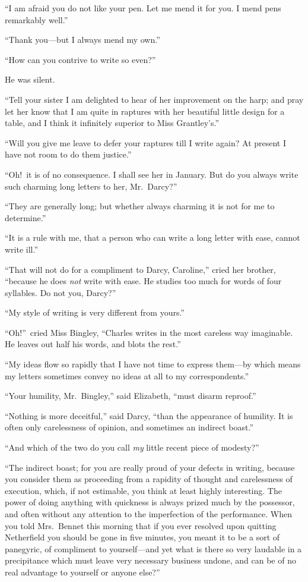 \documentclass[12pt,english]{book}
\begin{document}
{}``I am afraid you do not like your pen. Let me mend it for you.
I mend pens remarkably well.''

{}``Thank you\mbox{---}but I always mend my own.''

{}``How can you contrive to write so even?''\ 

He was silent.

{}``Tell your sister I am delighted to hear of her improvement on
the harp; and pray let her know that I am quite in raptures with her
beautiful little design for a table, and I think it infinitely superior
to Miss Grantley's.''

{}``Will you give me leave to defer your raptures till I write again?
At present I have not room to do them justice.''

{}``Oh!\ it is of no consequence. I shall see her in January. But
do you always write such charming long letters to her, Mr.\ Darcy?''\ 

{}``They are generally long; but whether always charming it is not
for me to determine.''

{}``It is a rule with me, that a person who can write a long letter
with ease, cannot write ill.''

{}``That will not do for a compliment to Darcy, Caroline,'' cried
her brother, {}``because he does \textit{not} write with ease. He
studies too much for words of four syllables. Do not you, Darcy?''\ 

{}``My style of writing is very different from yours.''

{}``Oh!''\ cried Miss Bingley, {}``Charles writes in the most
careless way imaginable. He leaves out half his words, and blots the
rest.''

{}``My ideas flow so rapidly that I have not time to express them\mbox{---}by
which means my letters sometimes convey no ideas at all to my correspondents.''

{}``Your humility, Mr.\ Bingley,'' said Elizabeth, {}``must disarm
reproof.''

{}``Nothing is more deceitful,'' said Darcy, {}``than the appearance
of humility. It is often only carelessness of opinion, and sometimes
an indirect boast.''

{}``And which of the two do you call \textit{my} little recent piece
of modesty?''\ 

{}``The indirect boast; for you are really proud of your defects
in writing, because you consider them as proceeding from a rapidity
of thought and carelessness of execution, which, if not estimable,
you think at least highly interesting. The power of doing anything
with quickness is always prized much by the possessor, and often without
any attention to the imperfection of the performance. When you told
Mrs.\ Bennet this morning that if you ever resolved upon quitting
Netherfield you should be gone in five minutes, you meant it to be
a sort of panegyric, of compliment to yourself\mbox{---}and yet what
is there so very laudable in a precipitance which must leave very
necessary business undone, and can be of no real advantage to yourself
or anyone else?''\ 
\end{document}

